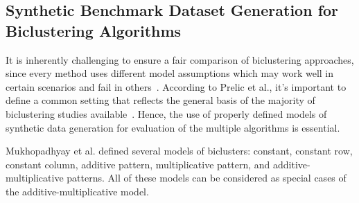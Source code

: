 


\subsection{Synthetic Benchmark Dataset Generation for Biclustering Algorithms}
\label{sec:syndata-review}

It is inherently challenging to ensure a fair comparison of biclustering approaches, since every method uses different model assumptions which may work well in certain scenarios and fail in others~\cite{prelic2006systematic}.
According to Prelic et al., it's important to define a common setting that reflects the general basis of the majority of biclustering studies available~\cite{prelic2006systematic}.
Hence, the use of properly defined models of synthetic data generation for evaluation of the multiple algorithms is essential.

Mukhopadhyay et al.\cite{mukhopadhyay2010biclustering} defined several models of biclusters: constant, constant row, constant column, additive pattern, multiplicative pattern, and additive-multiplicative patterns.
All of these models can be considered as special cases of the additive-multiplicative model.

